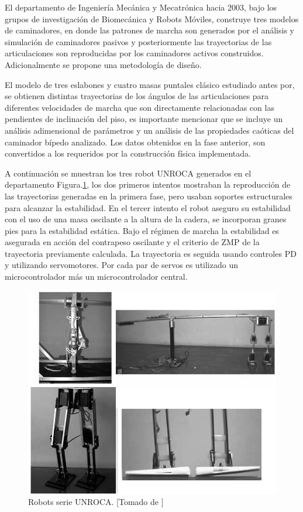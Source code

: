 El departamento de Ingenier\'ia Mec\'anica y Mecatr\'onica hacia 2003, bajo los grupos de investigaci\'on de Biomec\'anica y Robots M\'oviles, construye tres modelos de caminadores, en donde las patrones de marcha son generados por el an\'alisis y simulaci\'on de caminadores pasivos y posteriormente las trayectorias de las articulaciones son reproducidas por los caminadores activos construidos. Adicionalmente se propone una metodolog\'ia de dise\~no\cite{Heredia2007}.\par
El modelo de tres eslabones y cuatro masas puntales cl\'asico estudiado antes por\cite{McGeer1990a}, se obtienen distintas trayectorias de los \'angulos de las articulaciones para diferentes velocidades de marcha que son directamente relacionadas con las pendientes de inclinaci\'on del piso\cite{M2005}, es importante mencionar que se incluye un an\'alisis adimensional de parámetros y un an\'alisis de las propiedades ca\'oticas del caminador bípedo analizado\cite{M2005a}. Los datos obtenidos en la fase anterior, son convertidos a los requeridos por la construcci\'on f\'isica implementada.\par
A continuaci\'on se muestran los tres robot UNROCA generados en el departamento Figura.\ref{fig:unroca}, los dos primeros intentos mostraban la reproducci\'on de las trayectorias generadas en la primera fase, pero usaban soportes estructurales para alcanzar la estabilidad. En el tercer intento el robot aseguro su estabilidad con el uso de una masa oscilante a la altura de la cadera, se incorporan granes pies para la estabilidad est\'atica. Bajo el r\'egimen de marcha la estabilidad es asegurada en acci\'on del contrapeso oscilante y el criterio de ZMP de la trayectoria previamente calculada. La trayectoria es seguida usando controles PD y utilizando servomotores. Por cada par de servos es utilizado un microcontrolador m\'as un microcontrolador central\cite{M2005}.
\begin{figure}[!hbt]
  \centering
  \includegraphics[scale=0.4]{../images/unroca.png}
  \caption{Robots serie UNROCA. [Tomado de \cite{M2005}]}
  \label{fig:unroca}
\end{figure}

